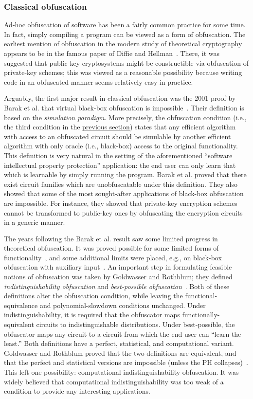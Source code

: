 \documentclass[11pt]{article}
\numberwithin{equation}{section}
\newcommand{\expreft}[2]{\texorpdfstring{\hyperref[#2]{#1}}{#1}}
\begin{document}
{\subsubsection{Classical obfuscation} 

Ad-hoc obfuscation of software has been a fairly common practice for some time. In fact, simply compiling a program can be viewed as a form of obfuscation.  The earliest mention of obfuscation in the modern study of theoretical cryptography appears to be in the famous paper of Diffie and Hellman~\cite{DH76}. There, it was suggested that public-key cryptosystems might be constructible via obfuscation of private-key schemes; this was viewed as a reasonable possibility because writing code in an obfuscated manner seems relatively easy in practice. 

Arguably, the first major result in classical obfuscation was the 2001 proof by Barak et al. that virtual black-box obfuscation is impossible~\cite{BGIRSVY01, BGIRSVY12}. Their definition is based on the \emph{simulation paradigm}. More precisely, the obfuscation condition (i.e., the third condition in the \expreft{previous section}{def:obf-informal}) states that any efficient algorithm with access to an obfuscated circuit should be simulable by another efficient algorithm with only oracle (i.e., black-box) access to the original functionality. This definition is very natural in the setting of the aforementioned ``software intellectual property protection'' application: the end user can only learn that which is learnable by simply running the program. Barak et al. proved that  there exist circuit families which are unobfuscatable under this definition. They also showed that some of the most sought-after applications of black-box obfuscation are impossible. For instance, they showed that private-key encryption schemes cannot be transformed to public-key ones by obfuscating the encryption circuits in a generic manner.

The years following the Barak et al. result saw some limited progress in theoretical obfuscation. It was proved possible for some limited forms of functionality~\cite{CD08, Wee05}, and some additional limits were placed, e.g., on black-box obfuscation with auxiliary input~\cite{GK05}. An important step in formulating feasible notions of obfuscation was taken by Goldwasser and Rothblum; they defined \emph{indistinguishability obfuscation} and \emph{best-possible obfuscation}~\cite{GR07}. Both of these definitions alter the obfuscation condition, while leaving the functional-equivalence and polynomial-slowdown conditions unchanged. Under indistinguishability, it is required that the obfuscator maps functionally-equivalent circuits to indistinguishable distributions. Under best-possible, the obfuscator maps any circuit to a circuit from which the end user can ``learn the least.'' Both definitions have a perfect, statistical, and computational variant. Goldwasser and Rothblum proved that the two definitions are equivalent, and that the perfect and statistical versions are impossible (unless the PH collapses)~\cite{GR07}. This left one possibility: computational indistinguishability obfuscation. It was widely believed that computational indistinguishability was too weak of a condition to provide any interesting applications.

}
\end{document}
